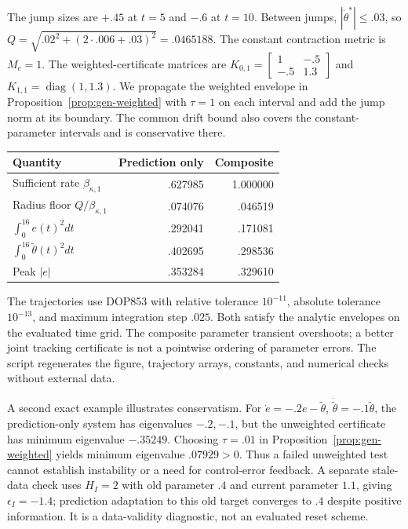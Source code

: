 The jump sizes are $+.45$ at $t=5$ and $-.6$ at $t=10$.
Between jumps, $|\dot\theta^*|\le.03$, so
$Q=\sqrt{.02^2+(2\cdot.006+.03)^2}=.0465188$.
The constant contraction metric is $M_c=1$. The weighted-certificate matrices are $K_{0,1}=\left[\begin{smallmatrix}1&-.5\\-.5&1.3\end{smallmatrix}\right]$
and $K_{1,1}=\operatorname{diag}(1,1.3)$.
We propagate the weighted envelope in Proposition~\ref{prop:gen-weighted} with $\tau=1$ on each interval and add the
jump norm at its boundary. The common drift bound also covers the
constant-parameter intervals and is conservative there.
\begin{center}\small
\begin{tabular}{lrr}
\toprule
Quantity & Prediction only & Composite\\
\midrule
Sufficient rate $\beta_{\kappa,1}$ & .627985 & 1.000000\\
Radius floor $Q/\beta_{\kappa,1}$ & .074076 & .046519\\
$\int_0^{16}e(t)^2dt$ & .292041 & .171081\\
$\int_0^{16}\tilde\theta(t)^2dt$ & .402695 & .298536\\
Peak $|e|$ & .353284 & .329610\\
\bottomrule
\end{tabular}
\end{center}
The trajectories use DOP853 with relative tolerance $10^{-11}$,
absolute tolerance $10^{-13}$, and maximum integration step $.025$.
Both satisfy the analytic envelopes on the evaluated time grid. The
composite parameter transient overshoots; a better joint tracking certificate is
not a pointwise ordering of parameter errors. The script
 regenerates the figure, trajectory
arrays, constants, and numerical checks without external data.

A second exact example illustrates conservatism. For
$\dot e=-.2e-\tilde\theta$, $\dot{\tilde\theta}=-.1\tilde\theta$,
the prediction-only system has eigenvalues $-.2,-.1$, but the unweighted
certificate has minimum eigenvalue $-.35249$. Choosing $\tau=.01$ in
Proposition~\ref{prop:gen-weighted} yields minimum eigenvalue $.07929>0$.
Thus a failed unweighted test cannot establish instability or a need for
control-error feedback. A separate stale-data check uses $H_I=2$ with
old parameter $.4$ and current parameter $1.1$, giving $\epsilon_I=-1.4$;
prediction adaptation to this old target converges to $.4$ despite positive
information. It is a data-validity diagnostic, not an evaluated reset scheme.

